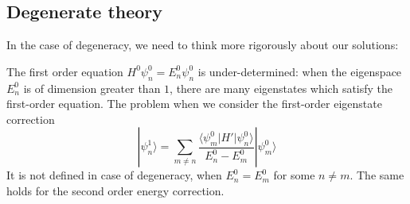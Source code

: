 
\subsection{Degenerate theory}

In the case of degeneracy, we need to think more rigorously about our solutions:

The first order equation \(H^0 \psi_n^0 = E_n^0 \psi_n^0\) 
is under-determined: when the eigenspace $E_n^0$ is of dimension greater than $1$, 
there are many eigenstates which satisfy the first-order equation. 
The problem when we consider the first-order eigenstate correction 
\[ 
    |\psi_n^{1}\rangle = \sum_{m \neq n} 
    \frac{\langle \psi_m^0 | H' | \psi_n^0 \rangle}
    {E_n^0 - E_m^0} | \psi_m^0 \rangle
\] 
It is not defined in case of degeneracy, when \(E_n^0 = E_m^0\) 
for some \(n \neq m\). The same holds for the second order energy correction. 


